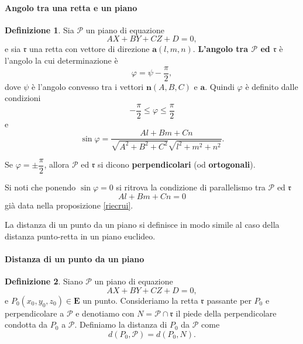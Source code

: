 \documentclass{article}
\theoremstyle{plain}
\theoremstyle{definition}
\newtheorem{defn}{Definizione}[section]
\theoremstyle{remark}
\begin{document}
\paragraph{Angolo tra una retta e un piano}
\begin{bxthm}
\begin{defn}
Sia $\mathscr{P}$ un piano di equazione 
\[AX + BY + CZ + D = 0,\]
e sia $\mathfrak{r}$ una retta 
con vettore di direzione $\mathbf{a}(l,m,n)$. 
\textbf{L'angolo tra $\mathscr{P}$ ed $\mathfrak{r}$} è l'angolo 
la cui determinazione è
\[
\varphi = \psi - \dfrac{\pi}{2},
\]
dove $\psi$ è l'angolo convesso tra i vettori $\mathbf{n}(A,B,C)$ e $\mathbf{a}$. 
Quindi $\varphi$ è definito dalle condizioni
\[
-\dfrac{\pi}{2} \le \varphi \le \dfrac{\pi}{2}
\]
e
\[
\sin \varphi = \frac{Al + Bm + Cn}{\sqrt{A^2 + B^2 + C^2} \sqrt{l^2 + m^2 + n^2}}.
\]    
\end{defn}
\end{bxthm}

\vspace{10pt}

Se $\varphi = \pm \dfrac{\pi}{2}$, allora $\mathscr{P}$ ed $\mathfrak{r}$ si dicono 
\textbf{perpendicolari} (od \textbf{ortogonali}).

\vspace{10pt}

Si noti che ponendo $\sin \varphi = 0$ si ritrova la condizione di parallelismo 
tra $\mathscr{P}$ ed $\mathfrak{r}$
\[
Al + Bm + Cn = 0
\]
già data nella proposizione \ref{riecrui}.

\vspace{10pt}

La distanza di un punto da un piano si definisce in modo simile al caso della distanza punto-retta in un piano 
euclideo.

\vspace{10pt}

\paragraph{Distanza di un punto da un piano}
\begin{bxthm}
\begin{defn}
Siano $\mathscr{P}$ un piano di equazione 
\[AX + BY + CZ + D = 0,\]
e $P_0(x_0, y_0, z_0) \in \mathbf{E}$ un punto. 
Consideriamo la retta $\mathfrak{r}$ passante per $P_0$ e perpendicolare a $\mathscr{P}$ e denotiamo con 
$N = \mathscr{P} \cap \mathfrak{r}$ il piede della perpendicolare condotta da $P_0$ a $\mathscr{P}$. Definiamo la 
distanza di $P_0$ da $\mathscr{P}$ come
\[
d(P_0, \mathscr{P}) = d(P_0, N).
\]    
\end{defn}
\end{bxthm}
\end{document}
